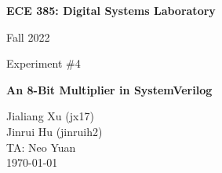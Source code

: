 \begin{titlepage}
    \begin{center}
            
        \Large
        \textbf{ECE 385: Digital Systems Laboratory}
            
        \vspace{0.2cm}
        Fall 2022
        
        \vspace{0.2cm}
        Experiment \#4

        \vfill
        
        \Huge
        \textbf{An 8-Bit Multiplier in SystemVerilog}
            
        \vfill
            
        \Large
        Jialiang Xu (jx17)\\
        Jinrui Hu (jinruih2)\\
        TA: Neo Yuan\\
        \today
            
    \end{center}
\end{titlepage}